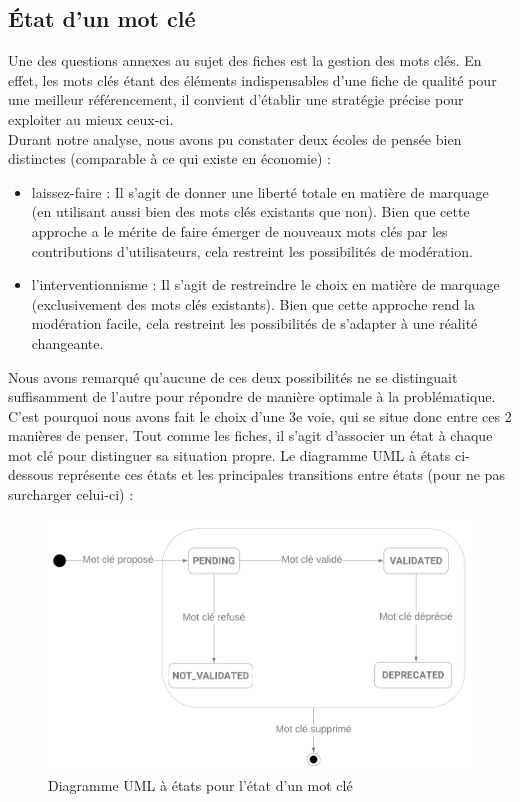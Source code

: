 \subsection*{État d'un mot clé}

Une des questions annexes au sujet des fiches est la gestion des mots clés. En effet, les mots clés étant des éléments indispensables d'une fiche de qualité pour une meilleur référencement, il convient d'établir une stratégie précise pour exploiter au mieux ceux-ci. \\

Durant notre analyse, nous avons pu constater deux écoles de pensée bien distinctes (comparable à ce qui existe en économie) : 
\pagebreak
\begin{itemize}
    \item laissez-faire : Il s'agit de donner une liberté totale en matière de marquage (en utilisant aussi bien des mots clés existants que non). Bien que cette approche a le mérite de faire émerger de nouveaux mots clés par les contributions d'utilisateurs, cela restreint les possibilités de modération.
    \item l'interventionnisme : Il s'agit de restreindre le choix en matière de marquage (exclusivement des mots clés existants). Bien que cette approche rend la modération facile, cela restreint les possibilités de s'adapter à une réalité changeante.
\end{itemize}

Nous avons remarqué qu'aucune de ces deux possibilités ne se distinguait suffisamment de l'autre pour répondre de manière optimale à la problématique.
C'est pourquoi nous avons fait le choix d'une 3e voie, qui se situe donc entre ces 2 manières de penser. Tout comme les fiches, il s'agit d'associer un état à chaque mot clé pour distinguer sa situation propre. Le diagramme UML à états ci-dessous représente ces états et les principales transitions entre états (pour ne pas surcharger celui-ci) :

\begin{figure}[H]
    \includegraphics[width=\textwidth,height=\textheight,keepaspectratio]{images/StateTags.png}
    \centering
    \caption{Diagramme UML à états pour l'état d'un mot clé}
    \label{pic:stateDiagramForTags}
\end{figure}

